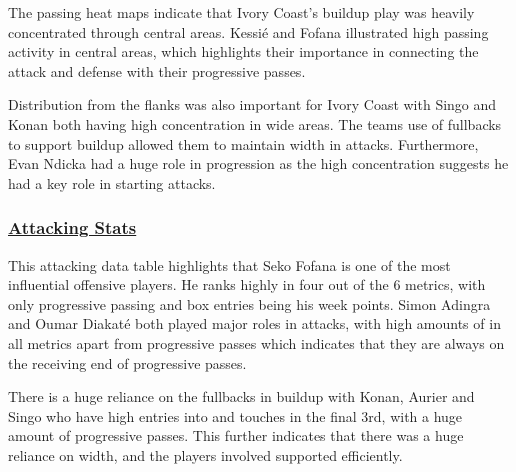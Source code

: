 \documentclass[
  11pt,
  letterpaper,
  DIV=11,
  numbers=noendperiod]{scrartcl}
\begin{document}
The passing heat maps indicate that Ivory Coast's buildup play was
heavily concentrated through central areas. Kessié and Fofana
illustrated high passing activity in central areas, which highlights
their importance in connecting the attack and defense with their
progressive passes.

Distribution from the flanks was also important for Ivory Coast with
Singo and Konan both having high concentration in wide areas. The teams
use of fullbacks to support buildup allowed them to maintain width in
attacks. Furthermore, Evan Ndicka had a huge role in progression as the
high concentration suggests he had a key role in starting attacks.

\subsubsection{\texorpdfstring{\ul{Attacking
Stats}}{Attacking Stats}}\label{attacking-stats}

This attacking data table highlights that Seko Fofana is one of the most
influential offensive players. He ranks highly in four out of the 6
metrics, with only progressive passing and box entries being his week
points. Simon Adingra and Oumar Diakaté both played major roles in
attacks, with high amounts of in all metrics apart from progressive
passes which indicates that they are always on the receiving end of
progressive passes.

There is a huge reliance on the fullbacks in buildup with Konan, Aurier
and Singo who have high entries into and touches in the final 3rd, with
a huge amount of progressive passes. This further indicates that there
was a huge reliance on width, and the players involved supported
efficiently.
\end{document}
